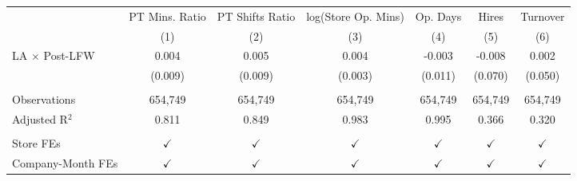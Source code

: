 \begingroup
\centering
\scriptsize
\begin{tabular}{lcccccc}
   \toprule
                         & PT Mins. Ratio & PT Shifts Ratio & log(Store Op. Mins) & Op. Days      & Hires         & Turnover\\    
                         & (1)            & (2)             & (3)                 & (4)           & (5)           & (6)\\  
   \midrule 
   LA $\times$ Post-LFW  & 0.004          & 0.005           & 0.004               & -0.003        & -0.008        & 0.002\\   
                         & (0.009)        & (0.009)         & (0.003)             & (0.011)       & (0.070)       & (0.050)\\   
    \\
   Observations          & 654,749        & 654,749         & 654,749             & 654,749       & 654,749       & 654,749\\  
   Adjusted R$^2$        & 0.811          & 0.849           & 0.983               & 0.995         & 0.366         & 0.320\\  
    \\
   Store FEs             & $\checkmark$   & $\checkmark$    & $\checkmark$        & $\checkmark$  & $\checkmark$  & $\checkmark$\\   
   Company-Month FEs     & $\checkmark$   & $\checkmark$    & $\checkmark$        & $\checkmark$  & $\checkmark$  & $\checkmark$\\   
   \bottomrule
\end{tabular}
\par\endgroup